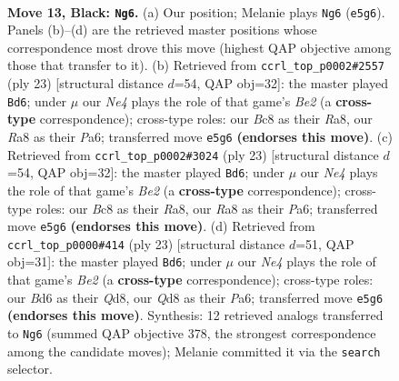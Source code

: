 \documentclass[11pt]{article}
\begin{document}
\clearpage

\begin{figure}[p]\centering
\begin{subfigure}{0.46\textwidth}\centering
\resizebox{\linewidth}{!}{%
\newchessgame
\chessboard[
  setfen={r1bq1rk1/pp3ppp/3b4/1B1pn3/3N4/3P3P/PPP2PP1/R1BQR1K1 b - - 0 13},
  showmover=false,
  pgfstyle=straightmove, color=movearrow, markmove={e5-g6}
]}
\caption{}
\end{subfigure}\hfill
\begin{subfigure}{0.46\textwidth}\centering
\resizebox{\linewidth}{!}{%
\newchessgame
\chessboard[
  setfen={r1bq1rk1/4bppp/p1p5/1p1nR3/3P4/1BP5/PP3PPP/RNBQ2K1 b - - 0 12},
  showmover=false,
  pgfstyle=straightmove, color=movearrow, markmove={e7-d6}
]}
\caption{}
\end{subfigure}
\\[4pt]
\begin{subfigure}{0.46\textwidth}\centering
\resizebox{\linewidth}{!}{%
\newchessgame
\chessboard[
  setfen={r1bq1rk1/4bppp/p1p5/1p1nR3/3P4/1BP5/PP3PPP/RNBQ2K1 b - - 0 12},
  showmover=false,
  pgfstyle=straightmove, color=movearrow, markmove={e7-d6}
]}
\caption{}
\end{subfigure}\hfill
\begin{subfigure}{0.46\textwidth}\centering
\resizebox{\linewidth}{!}{%
\newchessgame
\chessboard[
  setfen={r1bq1rk1/4bppp/p1p5/1p1nR3/8/1BPP4/PP3PPP/RNBQ2K1 b - - 0 12},
  showmover=false,
  pgfstyle=straightmove, color=movearrow, markmove={e7-d6}
]}
\caption{}
\end{subfigure}
\caption{\textbf{Move 13, Black: \texttt{Ng6}.} (a) Our position; Melanie plays \texttt{Ng6} (\texttt{e5g6}). Panels (b)--(d) are the retrieved master positions whose correspondence most drove this move (highest QAP objective among those that transfer to it). (b) Retrieved from \texttt{ccrl\_top\_p0002\#2557} (ply 23) [structural distance $d$=54, QAP obj=32]: the master played \texttt{Bd6}; under $\mu$ our \emph{Ne4} plays the role of that game's \emph{Be2} (a \textbf{cross-type} correspondence); cross-type roles: our \emph{B}c8 as their \emph{R}a8, our \emph{R}a8 as their \emph{P}a6; transferred move \texttt{e5g6} \textbf{(endorses this move)}. (c) Retrieved from \texttt{ccrl\_top\_p0002\#3024} (ply 23) [structural distance $d$=54, QAP obj=32]: the master played \texttt{Bd6}; under $\mu$ our \emph{Ne4} plays the role of that game's \emph{Be2} (a \textbf{cross-type} correspondence); cross-type roles: our \emph{B}c8 as their \emph{R}a8, our \emph{R}a8 as their \emph{P}a6; transferred move \texttt{e5g6} \textbf{(endorses this move)}. (d) Retrieved from \texttt{ccrl\_top\_p0000\#414} (ply 23) [structural distance $d$=51, QAP obj=31]: the master played \texttt{Bd6}; under $\mu$ our \emph{Ne4} plays the role of that game's \emph{Be2} (a \textbf{cross-type} correspondence); cross-type roles: our \emph{B}d6 as their \emph{Q}d8, our \emph{Q}d8 as their \emph{P}a6; transferred move \texttt{e5g6} \textbf{(endorses this move)}. Synthesis: 12 retrieved analogs transferred to \texttt{Ng6} (summed QAP objective 378, the strongest correspondence among the candidate moves); Melanie committed it via the \texttt{search} selector.}
\label{fig:thought-m25}
\end{figure}
\end{document}
